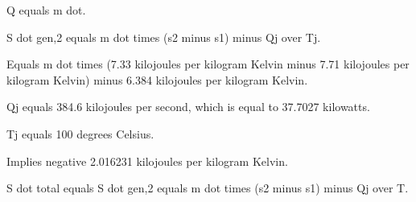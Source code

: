 Q equals m dot.

S dot gen,2 equals m dot times (s2 minus s1) minus Qj over Tj.

Equals m dot times (7.33 kilojoules per kilogram Kelvin minus 7.71 kilojoules per kilogram Kelvin) minus 6.384 kilojoules per kilogram Kelvin.

Qj equals 384.6 kilojoules per second, which is equal to 37.7027 kilowatts.

Tj equals 100 degrees Celsius.

Implies negative 2.016231 kilojoules per kilogram Kelvin.

S dot total equals S dot gen,2 equals m dot times (s2 minus s1) minus Qj over T.